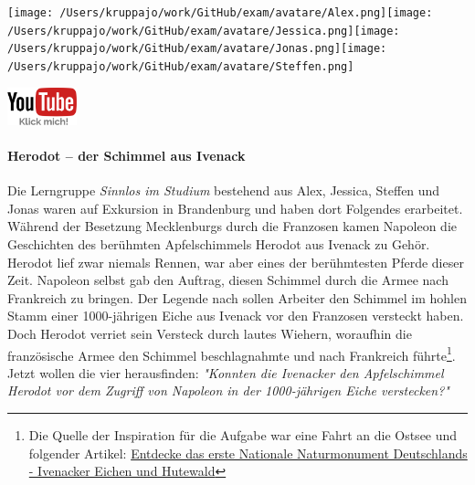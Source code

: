 \documentclass[a4paper, 9pt]{scrartcl}\usepackage[]{graphicx}\usepackage[]{xcolor}
\begin{document}
 
\ifcollection
\begin{flushright}
\tiny\vspace{-3Ex}
\textbf{\examinhaltstart}
\exammodulemathstat
\vspace{-4Ex}
\end{flushright}
\begin{minipage}[t]{0.5\textwidth}
\texttt{[image: /Users/kruppajo/work/GitHub/exam/avatare/Alex.png]}\hspace{-4mm}\texttt{[image: /Users/kruppajo/work/GitHub/exam/avatare/Jessica.png]}\hspace{-4mm}\texttt{[image: /Users/kruppajo/work/GitHub/exam/avatare/Jonas.png]}\hspace{-4mm}\texttt{[image: /Users/kruppajo/work/GitHub/exam/avatare/Steffen.png]}
\end{minipage}
\begin{minipage}[t]{0.5\textwidth}
\hfill
\href{https://youtu.be/Fu8kN0Uj13Y}{\includegraphics[width = 2cm]{img/youtube}}
\end{minipage}
\fi



\ifcollection
\paragraph{Herodot – der Schimmel aus Ivenack}
\fi

Die Lerngruppe \textit{Sinnlos im Studium} bestehend aus Alex, Jessica, Steffen und Jonas waren auf Exkursion in Brandenburg und haben dort Folgendes erarbeitet. Während der Besetzung Mecklenburgs durch die Franzosen kamen Napoleon die Geschichten des berühmten Apfelschimmels Herodot aus Ivenack zu Gehör. Herodot lief zwar niemals Rennen, war aber eines der berühmtesten Pferde dieser Zeit. Napoleon selbst gab den Auftrag, diesen Schimmel durch die Armee nach Frankreich zu bringen. Der Legende nach sollen Arbeiter den Schimmel im hohlen Stamm einer 1000-jährigen Eiche aus Ivenack vor den Franzosen versteckt haben. Doch Herodot verriet sein Versteck durch lautes Wiehern, woraufhin die französische Armee den Schimmel beschlagnahmte und nach Frankreich führte\footnote{Die Quelle der Inspiration  für die Aufgabe war eine Fahrt an die Ostsee und folgender Artikel:
  \href{https://www.wald-mv.de/landingpage/ivenacker-eichen/}{Entdecke das erste Nationale Naturmonument Deutschlands - Ivenacker Eichen und Hutewald}}. Jetzt wollen die vier herausfinden: \textit{"Konnten die Ivenacker den Apfelschimmel Herodot vor dem Zugriff von Napoleon in der 1000-jährigen Eiche verstecken?"} 
\end{document}
